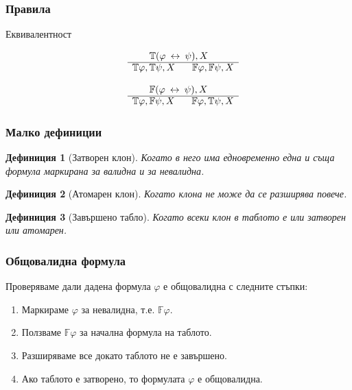 \documentclass{beamer}
\newtheorem{defn}{Дефиниция}[section]
\newcommand{\signT}{\mathbb{T}}
\newcommand{\signF}{\mathbb{F}}
\begin{document}
\begin{frame}\frametitle{Правила}
Еквивалентност
		\noindent\begin{minipage}{.5\linewidth}
		\begin{align*}
			\begin{array}{rl}
				& \:\:\:\:\:\:\:\: \signT(\varphi \: \leftrightarrow \: \psi), X \\
			      \cline{2-2}
			      & \signT\varphi, \signT\psi, X \:\:\:\:\:\:\:\: \signF\varphi, \signF\psi, X
			\end{array}
		\end{align*}
		\end{minipage}%
		\begin{minipage}{.5\linewidth}
		\begin{align*}
			\begin{array}{rl}
				& \:\:\:\:\:\:\:\: \signF(\varphi \: \leftrightarrow \: \psi), X \\
			      \cline{2-2}
			      & \signT\varphi, \signF\psi, X \:\:\:\:\:\:\:\: \signF\varphi, \signT\psi, X
			\end{array}
		\end{align*}
		\end{minipage}
\end{frame}

\begin{frame}\frametitle{Малко дефиниции}

\begin{defn}[Затворен клон]
Когато в него има едновременно една и съща формула маркирана за валидна и за невалидна.
\end{defn}

\begin{defn}[Атомарен клон]
Когато клона не може да се разширява повече.
\end{defn}

\begin{defn}[Завършено табло]
Когато всеки клон в таблото е или затворен или атомарен.
\end{defn}
\end{frame}

\begin{frame}\frametitle{Общовалидна формула}
	Проверяваме дали дадена формула $\varphi$ е общовалидна с следните стъпки:
\begin{enumerate}
	\item Маркираме $\varphi$ за невалидна, т.е.  $\signF\varphi$.
	\item Ползваме $\signF\varphi$ за начална формула на таблото.
	\item Разширяваме все докато таблото не е завършено.
	\item Ако таблото е затворено, то формулата $\varphi$ е общовалидна.
\end{enumerate}
\end{frame}
\end{document}
